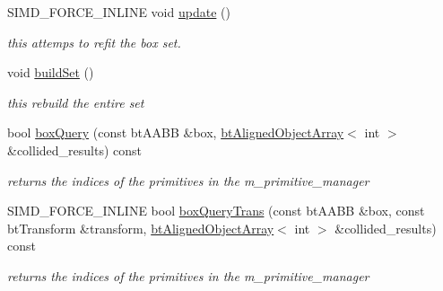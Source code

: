 \begin{DoxyCompactItemize}
\item 
S\+I\+M\+D\+\_\+\+F\+O\+R\+C\+E\+\_\+\+I\+N\+L\+I\+NE void \hyperlink{classbtGImpactQuantizedBvh_a71665f5245b8f7de1c54f107ef262cd0}{update} ()
\begin{DoxyCompactList}\small\item\em this attemps to refit the box set. \end{DoxyCompactList}\item 
\mbox{\label{classbtGImpactQuantizedBvh_a2f061fbf0c6d8a81438861be4add7968}} 
void \hyperlink{classbtGImpactQuantizedBvh_a2f061fbf0c6d8a81438861be4add7968}{build\+Set} ()
\begin{DoxyCompactList}\small\item\em this rebuild the entire set \end{DoxyCompactList}\item 
\mbox{\label{classbtGImpactQuantizedBvh_a4d2e0f3b36bf101f99b413632d6409a5}} 
bool \hyperlink{classbtGImpactQuantizedBvh_a4d2e0f3b36bf101f99b413632d6409a5}{box\+Query} (const bt\+A\+A\+BB \&box, \hyperlink{classbtAlignedObjectArray}{bt\+Aligned\+Object\+Array}$<$ int $>$ \&collided\+\_\+results) const
\begin{DoxyCompactList}\small\item\em returns the indices of the primitives in the m\+\_\+primitive\+\_\+manager \end{DoxyCompactList}\item 
\mbox{\label{classbtGImpactQuantizedBvh_a9f3bfa448f70606b8afd81a53b889111}} 
S\+I\+M\+D\+\_\+\+F\+O\+R\+C\+E\+\_\+\+I\+N\+L\+I\+NE bool \hyperlink{classbtGImpactQuantizedBvh_a9f3bfa448f70606b8afd81a53b889111}{box\+Query\+Trans} (const bt\+A\+A\+BB \&box, const bt\+Transform \&transform, \hyperlink{classbtAlignedObjectArray}{bt\+Aligned\+Object\+Array}$<$ int $>$ \&collided\+\_\+results) const
\begin{DoxyCompactList}\small\item\em returns the indices of the primitives in the m\+\_\+primitive\+\_\+manager \end{DoxyCompactList}\item 
\mbox{\label{classbtGImpactQuantizedBvh_a0a97a57a30a5f014154e417f16390460}} 

\end{DoxyCompactItemize}

